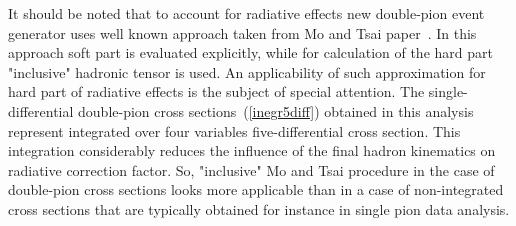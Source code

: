 It should be noted that to account for radiative effects new double-pion event generator uses well
known approach taken from Mo and Tsai paper~\cite{Mo:1968cg}.
In this approach soft part is evaluated
explicitly, while for calculation of the hard part "inclusive" hadronic
tensor is used. An applicability
of such approximation for hard part of
radiative effects is the subject of special
attention. The single-differential double-pion cross sections~(\ref{inegr5diff}) obtained in this analysis represent integrated over four
variables five-differential cross section. This
integration considerably reduces the influence of
the final hadron kinematics on
radiative correction factor. So,
"inclusive" Mo and Tsai procedure in the case of double-pion cross sections  looks more
applicable than in a case
of non-integrated cross sections that are typically obtained for instance in single pion data analysis.
